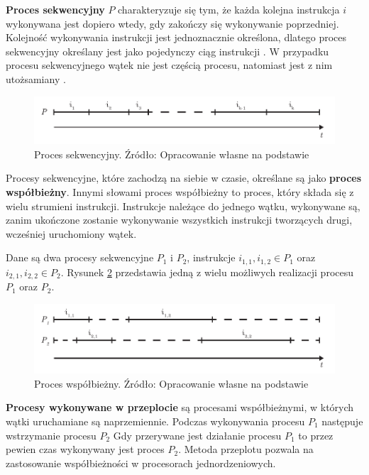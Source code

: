 \documentclass[12pt]{article}
\begin{document}
\textbf{Proces sekwencyjny} $P$ charakteryzuje się tym, że każda kolejna instrukcja $i$ wykonywana jest dopiero wtedy, gdy zakończy
się wykonywanie poprzedniej. Kolejność wykonywania instrukcji jest jednoznacznie określona, dlatego proces sekwencyjny
określany jest jako pojedynczy ciąg instrukcji \cite{wprowadzenie-do-obliczen-rownoleglych}. W przypadku procesu sekwencyjnego
wątek nie jest częścią procesu, natomiast jest z nim utożsamiany \cite{skrypt}.

\begin{figure}[H]
    \centering
	\includegraphics[width=\textwidth]{sequential.pdf}
    \caption{Proces sekwencyjny. Źródło: Opracowanie własne na podstawie \cite{wprowadzenie-do-obliczen-rownoleglych}}
    \label{fig:sequential}
\end{figure}

\newpage 

Procesy sekwencyjne, które zachodzą na siebie w czasie, określane są jako \textbf{proces współbieżny}. Innymi słowami
proces współbieżny to proces, który składa się z wielu strumieni instrukcji.
Instrukcje należące do jednego wątku, wykonywane są, zanim ukończone zostanie wykonywanie
wszystkich instrukcji tworzących drugi, wcześniej uruchomiony wątek.

Dane są dwa procesy sekwencyjne $P_1$ i $P_2$, instrukcje $i_{1,1}, i_{1,2} \in P_1$ oraz $i_{2,1}, i_{2,2} \in P_2$.
Rysunek \ref{fig:concurrent} przedstawia jedną z wielu możliwych realizacji procesu $P_1$ oraz $P_2$.

\begin{figure}[H]
    \centering
	\includegraphics[width=\textwidth]{concurrent.pdf}
    \caption{Proces współbieżny. Źródło: Opracowanie własne na podstawie \cite{wprowadzenie-do-obliczen-rownoleglych}}
    \label{fig:concurrent}
\end{figure}

\textbf{Procesy wykonywane w przeplocie} są procesami współbieżnymi, w których wątki uruchamiane są naprzemiennie. Podczas wykonywania procesu $P_1$
następuje wstrzymanie procesu $P_2$ Gdy przerywane jest działanie procesu $P_1$ to przez pewien czas wykonywany
jest proces $P_2$. Metoda przeplotu pozwala na zastosowanie współbieżności w procesorach jednordzeniowych.
\end{document}
